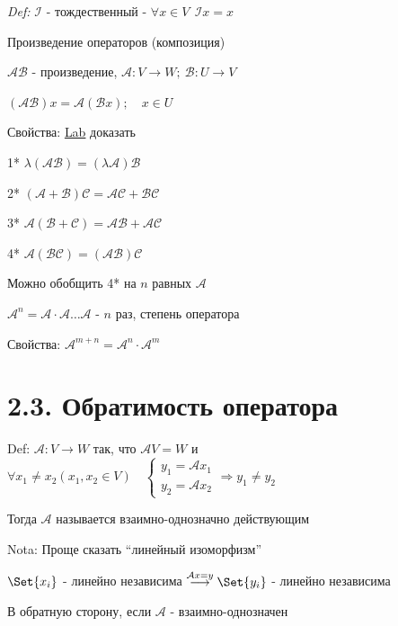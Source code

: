 \documentclass[12pt]{article}
\begin{document}
    \textit{Def:} $\mathcal{I}$ - тождественный - $\forall x \in V \ \ \mathcal{I}x = x$



    \Def Произведение операторов (композиция)

    $\mathcal{A}\mathcal{B}$ - произведение, $\mathcal{A} : V \rightarrow W; \ \mathcal{B} : U \rightarrow V$

    $(\mathcal{A}\mathcal{B}) x = \mathcal{A}(\mathcal{B}x); \quad x \in U$

    Свойства: \underline{Lab} доказать

    1* $\lambda (\mathcal{A}\mathcal{B}) = (\lambda \mathcal{A})\mathcal{B}$

    2* $(\mathcal{A} + \mathcal{B}) \mathcal{C} = \mathcal{A}\mathcal{C} + \mathcal{B}\mathcal{C}$

    3* $\mathcal{A} (\mathcal{B} + \mathcal{C}) = \mathcal{A}\mathcal{B} + \mathcal{A}\mathcal{C}$

    4* $\mathcal{A} (\mathcal{B}\mathcal{C}) = (\mathcal{A}\mathcal{B}) \mathcal{C}$


    \Nota Можно обобщить 4* на $n$ равных $\mathcal{A}$

    \Def $\displaystyle \mathcal{A}^n = \mathcal{A} \cdot \mathcal{A} \dots \mathcal{A}$ - $n$ раз, степень оператора

    Свойства: $\displaystyle \mathcal{A}^{m + n} = \mathcal{A}^n \cdot \mathcal{A}^m$

    \section{2.3. Обратимость оператора}

    Def: $\mathcal{A} : V \rightarrow W$ так, что $\mathcal{A}V = W$ и $\displaystyle \forall x_1 \neq x_2 (x_1, x_2 \in V) \quad
    \begin{cases}y_1 = \mathcal{A}x_1 \\ y_2 = \mathcal{A}x_2\end{cases} \Longrightarrow y_1 \neq y_2$

    Тогда $\mathcal{A}$ называется взаимно-однозначно действующим

    Nota: Проще сказать \enquote{линейный изоморфизм}

    \Th $\displaystyle \Set{x_i}$ - линейно независима $\displaystyle \stackrel{\mathcal{A}x = y}{\longrightarrow} \Set{y_i}$ - линейно независима

    В обратную сторону, если $\mathcal{A}$ - взаимно-однозначен
\end{document}
